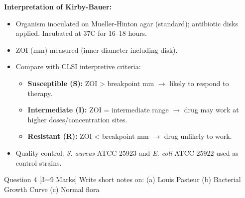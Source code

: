 \documentclass[11pt,a4paper]{article}
\begin{document}
\begin{ansbox}
\textbf{Interpretation of Kirby-Bauer:}
\begin{itemize}[leftmargin=*]
    \item Organism inoculated on Mueller-Hinton agar (standard); antibiotic disks applied. Incubated at 37\textdegree C for 16--18 hours.
    \item ZOI (mm) measured (inner diameter including disk).
    \item Compare with CLSI interpretive criteria:
    \begin{itemize}
        \item \textbf{Susceptible (S):} ZOI \textgreater{} breakpoint mm $\rightarrow$ likely to respond to therapy.
        \item \textbf{Intermediate (I):} ZOI = intermediate range $\rightarrow$ drug may work at higher doses/concentration sites.
        \item \textbf{Resistant (R):} ZOI \textless{} breakpoint mm $\rightarrow$ drug unlikely to work.
    \end{itemize}
    \item Quality control: \textit{S. aureus} ATCC 25923 and \textit{E. coli} ATCC 25922 used as control strains.
\end{itemize}
\end{ansbox}

\begin{qbox}{Question 4 [3=9 Marks]}
Write short notes on: (a) Louis Pasteur \quad (b) Bacterial Growth Curve \quad (c) Normal flora
\end{qbox}
\end{document}
